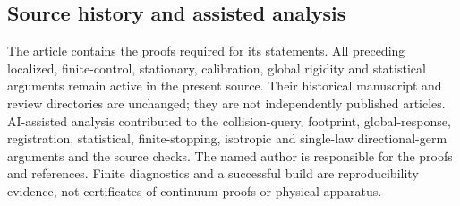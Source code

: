 \documentclass[11pt]{amsart}
\theoremstyle{definition}\newtheorem{definition}[theorem]{Definition}
\theoremstyle{remark}\newtheorem{remark}[theorem]{Remark}
\numberwithin{equation}{section}
\begin{document}
\subsection*{Source history and assisted analysis}
The article contains the proofs required for its statements. All
preceding localized, finite-control, stationary, calibration, global
rigidity and statistical arguments remain active in the present source.
Their historical manuscript and review directories are unchanged; they
are not independently published articles. AI-assisted analysis
contributed to the collision-query, footprint, global-response,
registration, statistical, finite-stopping, isotropic and single-law
directional-germ arguments and
the source checks. The named author is responsible for the proofs and
references. Finite diagnostics and a successful build are reproducibility
evidence, not certificates of continuum proofs or physical apparatus.

\end{document}
